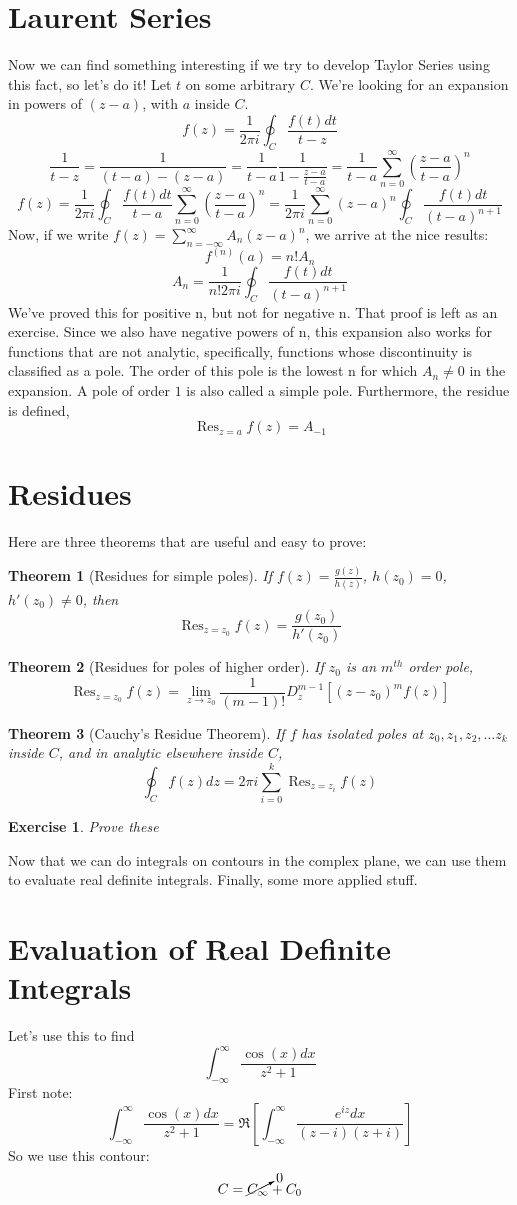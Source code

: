 \documentclass[11pt,notitlepage]{article}
\DeclareMathOperator*{\res}{Res}
\newtheorem{thm}{Theorem}[section]
\newtheorem{exc}{Exercise}[section]
\begin{document}
\section{Laurent Series}
Now we can find something interesting if we try to develop Taylor Series using this fact, so let's do it! Let $t$ on some arbitrary $C$. We're looking for an expansion in powers of $(z-a)$, with $a$ inside $C$. 
$$ f(z) = \frac1{2\pi i}\oint_{C} \frac{f(t) dt}{t-z} $$
$$\frac1{t-z} = \frac1{(t-a)-(z-a)} = \frac1{t-a}\frac1{1-{\frac{z-a}{t-a}}} = \frac1{t-a}\sum_{n=0}^\infty\left(\frac{z-a}{t-a}\right)^n $$
$$ f(z) = \frac1{2\pi i}\oint_{C} \frac{f(t) dt}{t-a} \sum_{n=0}^\infty\left(\frac{z-a}{t-a}\right)^n  = \frac1{2\pi i} \sum_{n=0}^\infty{(z-a)}^n \oint_{C} \frac{f(t) dt}{(t-a)^{n+1}} $$
Now, if we write $f(z) = \sum_{n=-\infty}^\infty A_n (z-a)^n$, we arrive at the nice results:
 $$f^{(n)}(a) = n! A_n$$
 $$A_n = \frac1{n!2\pi i} \oint_{C}\frac{f(t) dt}{(t-a)^{n+1}}$$
We've proved this for positive n, but not for negative n. That proof is left as an exercise.
Since we also have negative powers of n, this expansion also works for functions that are not analytic, specifically, functions whose discontinuity is classified as a pole. The order of this pole is the lowest n for which $A_n \not=0$ in the expansion. A pole of order $1$ is also called a simple pole. Furthermore, the residue is defined, $$\res_{z=a} f(z) = A_{-1}$$
\section{Residues}
Here are three theorems that are useful and easy to prove:
\begin{thm}[Residues for simple poles]
If $f(z)=\frac{g(z)}{h(z)}$, $h(z_0)=0$, $h'(z_0)\not=0$, then $$\res_{z=z_0} f(z) = \frac{g(z_0)}{h'(z_0)}$$
\end{thm}
\begin{thm}[Residues for poles of higher order]
If $z_0$ is an $m^{th}$ order pole, 
$$\res_{z=z_0} f(z) = \lim_{z\rightarrow z_0} \frac1{(m-1)!} D_z^{m-1} \left[(z-z_0)^m f(z)\right]$$
\end{thm}
\begin{thm}[Cauchy's Residue Theorem]
If $f$ has isolated poles at $z_0,z_1,z_2, \ldots z_k$ inside $C$, and in analytic elsewhere inside $C$,
$$\oint_C f(z) dz = 2\pi i\sum_{i=0}^k \res_{z=z_i} f(z)$$
\end{thm}
\begin{exc} Prove these
\end{exc}
Now that we can do integrals on contours in the complex plane, we can use them to evaluate real definite integrals. Finally, some more applied stuff.
\section{Evaluation of Real Definite Integrals}
Let's use this to find $$\int_{-\infty}^{\infty} \frac{\cos(x)dx}{z^2+1}$$
First note: $$\int_{-\infty}^{\infty} \frac{\cos(x)dx}{z^2+1} = \Re\left[\int_{-\infty}^{\infty} \frac{e^{iz}dx}{(z-i)(z+i)}\right]$$
So we use this contour: $$C = \cancelto0{C_\infty} + C_0$$
\end{document}
